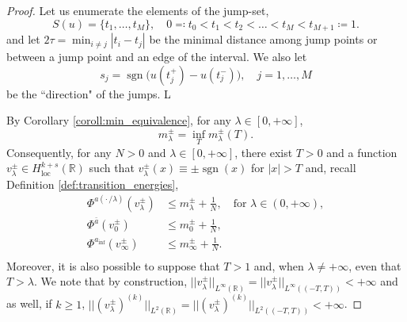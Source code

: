 \documentclass[10pt,a4paper]{amsart}
\newcommand{\R}{\mathbb{R}}
\newcommand{\abs}[1]{\left|#1\right|}
\newcommand{\sgn}{\operatorname{sgn}}
\begin{document}
\begin{proof}
    Let us enumerate the elements of the jump-set,
    \[S(u)= \{t_1,\dots, t_M\},  \quad 0\eqqcolon t_0< t_1<t_2<\ldots<t_M<t_{M+1}\coloneqq 1.\] 
    and let  $2\displaystyle\tau=\min_{i\ne j}|t_i-t_j|$ be the minimal distance among jump points or between a jump point and an edge of the interval. We also let
    \[s_j = \sgn\big(u(t_j^+)- u(t_j^-)\big),\quad j=1,\ldots, M\] 
        be the ``direction" of the jumps. L
        
    By Corollary \ref{coroll:min_equivalence}, for any $\lambda\in [0,+\infty]$, \[m^\pm_{\lambda} = \inf_T m^\pm_{\lambda}(T).\]    
   Consequently, for any $N>0$ and $\lambda\in [0,+\infty]$, there exist $T>0$ and a function $v^\pm_\lambda\in H^{k+s}_{\operatorname{loc}}(\R)$ such that $v^\pm_\lambda(x) \equiv \pm\sgn(x)$ for $\abs{x}>T$ and, recall Definition \ref{def:transition_energies},
    \begin{equation}\label{eq:approx_choice}
       \begin{split}
            \Phi^{a(\cdot\,/\lambda)}(v^\pm_\lambda) &\leq m_\lambda^{\pm} + \frac{1}{N}, \quad \text{for }\lambda\in (0,+\infty),\\
             \Phi^{\bar a}(v^\pm_0) &\leq m_0^{\pm} + \frac{1}{N},\\
              \Phi^{a_{\inf}}(v^\pm_\infty) &\leq m_\infty^{\pm} + \frac{1}{N}.\\
       \end{split}
    \end{equation} 
    Moreover, it is also possible to suppose that $T>1$ and, when $\lambda \ne +\infty$, even that $T>\lambda$.
    We note that by construction, $||v^\pm_\lambda||_{L^\infty(\R)} =  ||v^\pm_\lambda||_{L^\infty((-T,T))}<+\infty$ and as well, if $k\geq 1$, $||(v^\pm_\lambda)^{(k)}||_{L^2(\R)} = ||(v^\pm_\lambda)^{(k)}||_{L^2((-T,T))}<+\infty$.


\end{proof}
\end{document}
